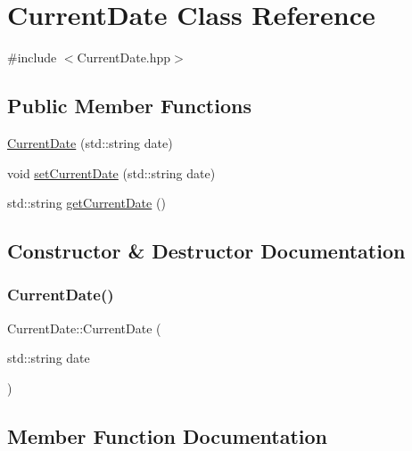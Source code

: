 \hypertarget{class_current_date}{}\section{Current\+Date Class Reference}
\label{class_current_date}


{\ttfamily \#include $<$Current\+Date.\+hpp$>$}

\subsection*{Public Member Functions}
\begin{DoxyCompactItemize}
\item 
\mbox{\hyperlink{class_current_date_a9fa53e4dbb4aeb1d398cc5ac6f267a08}{Current\+Date}} (std\+::string date)
\item 
void \mbox{\hyperlink{class_current_date_a01fbf35d387f69df1a16eb9899b5c9ab}{set\+Current\+Date}} (std\+::string date)
\item 
std\+::string \mbox{\hyperlink{class_current_date_a8a58d6806adbdad8ce9741fc628bbcbf}{get\+Current\+Date}} ()
\end{DoxyCompactItemize}


\subsection{Constructor \& Destructor Documentation}
\mbox{\label{class_current_date_a9fa53e4dbb4aeb1d398cc5ac6f267a08}} 
\subsubsection{\texorpdfstring{CurrentDate()}{CurrentDate()}}
{\footnotesize\ttfamily Current\+Date\+::\+Current\+Date (\begin{DoxyParamCaption}\item[{std\+::string}]{date }\end{DoxyParamCaption})}



\subsection{Member Function Documentation}
\mbox{\label{class_current_date_a8a58d6806adbdad8ce9741fc628bbcbf}} 
